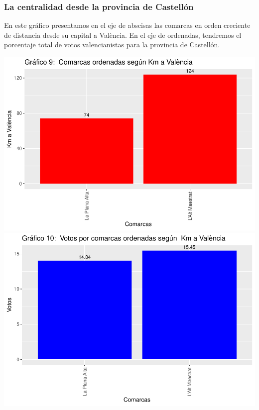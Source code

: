 \documentclass[
]{article}
\begin{document}
\hypertarget{la-centralidad-desde-la-provincia-de-castelluxf3n}{%
\subsubsection{La centralidad desde la provincia de
Castellón}\label{la-centralidad-desde-la-provincia-de-castelluxf3n}}

En este gráfico presentamos en el eje de abscisas las comarcas en orden
creciente de distancia desde su capital a València. En el eje de
ordenadas, tendremos el porcentaje total de votos valencianistas para la
provincia de Castellón.

\includegraphics{votovalencianista-ea2023_files/figure-latex/ordenDistanciacapitalCastellon-1.pdf}
\includegraphics{votovalencianista-ea2023_files/figure-latex/ordenDistanciacapitalCastellon-2.pdf}
\end{document}

